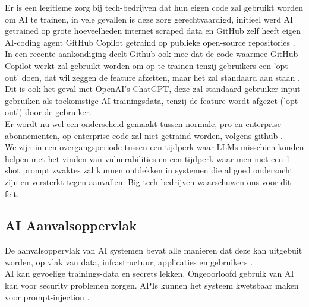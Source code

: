 Er is een legitieme zorg bij tech-bedrijven dat hun eigen code zal gebruikt worden om AI te trainen, in vele gevallen is deze zorg gerechtvaardigd, initieel werd AI getrained op grote hoeveelheden internet scraped data en GitHub zelf heeft eigen AI-coding agent GitHub Copilot getraind op publieke open-source repositories \autocite{Claburn2022}. In een recente aankondiging deelt Github ook mee dat de code waarmee GitHub Copilot werkt zal gebruikt worden om op te trainen tenzij gebruikers een 'opt-out' doen, dat wil zeggen de feature afzetten, maar het zal standaard aan staan \autocite{Rodriguez2026}. Dit is ook het geval met OpenAI's ChatGPT, deze zal standaard gebruiker input gebruiken als toekomstige AI-trainingsdata, tenzij de feature wordt afgezet ('opt-out') door de gebruiker. \\

Er wordt nu wel een onderscheid gemaakt tussen normale, pro en enterprise abonnementen, op enterprise code zal niet getraind worden, volgens github \autocite{Rodriguez2026}. \\

We zijn in een overgangsperiode tussen een tijdperk waar LLMs  misschien konden helpen met het vinden van vulnerabilities en een tijdperk waar men met een 1-shot prompt zwaktes zal kunnen ontdekken in systemen die al goed onderzocht zijn en versterkt tegen aanvallen. Big-tech bedrijven waarschuwen ons voor dit feit.

\subsection{AI Aanvalsoppervlak}
\label{ssec:aiaanvalsoppervlak}


De aanvalsoppervlak van AI systemen bevat alle manieren dat deze kan uitgebuit worden, op vlak van data, infrastructuur, applicaties en gebruikers \autocite{Ramnarayanan2025}.\\

AI kan gevoelige trainings-data en secrets lekken. Ongeoorloofd gebruik van AI kan voor security problemen zorgen. APIs kunnen het systeem kwetsbaar maken voor prompt-injection \autocite{Ramnarayanan2025}. \\


